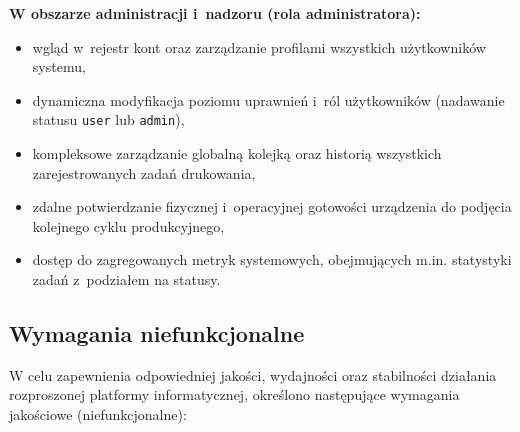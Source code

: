 \documentclass[a4paper,12pt,reqno]{article}
\begin{document}
\noindent\textbf{W obszarze administracji i~nadzoru (rola administratora):}
\begin{itemize}
	\item wgląd w~rejestr kont oraz zarządzanie profilami wszystkich użytkowników systemu,
	\item dynamiczna modyfikacja poziomu uprawnień i~ról użytkowników (nadawanie statusu \texttt{user} lub \texttt{admin}),
	\item kompleksowe zarządzanie globalną kolejką oraz historią wszystkich zarejestrowanych zadań drukowania,
	\item zdalne potwierdzanie fizycznej i~operacyjnej gotowości urządzenia do podjęcia kolejnego cyklu produkcyjnego,
	\item dostęp do zagregowanych metryk systemowych, obejmujących m.in. statystyki zadań z~podziałem na statusy.
\end{itemize}

\subsection{Wymagania niefunkcjonalne}

W celu zapewnienia odpowiedniej jakości, wydajności oraz stabilności działania rozproszonej platformy informatycznej, określono następujące wymagania jakościowe (niefunkcjonalne):
\end{document}
